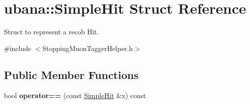 \hypertarget{structubana_1_1SimpleHit}{\section{ubana\-:\-:Simple\-Hit Struct Reference}
\label{structubana_1_1SimpleHit}
}


Struct to represent a recob Hit.  




{\ttfamily \#include $<$Stopping\-Muon\-Tagger\-Helper.\-h$>$}

\subsection*{Public Member Functions}
\begin{DoxyCompactItemize}
\item 
\hypertarget{structubana_1_1SimpleHit_a8caa8bfeec00dae4f31dd2dab4846ae0}{bool {\bfseries operator==} (const \hyperlink{structubana_1_1SimpleHit}{Simple\-Hit} \&x) const }\label{structubana_1_1SimpleHit_a8caa8bfeec00dae4f31dd2dab4846ae0}

\end{DoxyCompactItemize}
